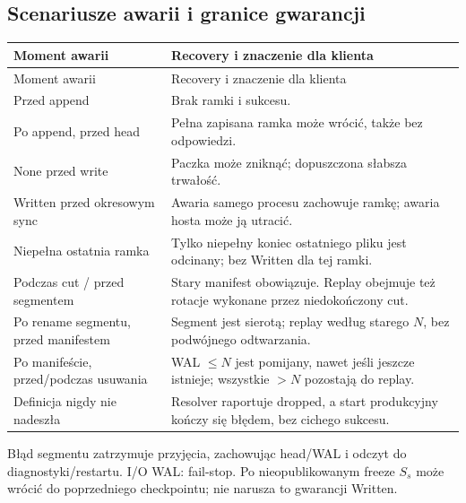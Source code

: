 \documentclass[11pt,a4paper]{article}
\newcommand{\tabhead}[1]{\toprule #1\\ \midrule\endfirsthead
  \toprule #1\\ \midrule\endhead \bottomrule\endfoot}
\begin{document}
\subsection{Scenariusze awarii i granice gwarancji}
\begin{longtable}{P{44mm}P{112mm}}
\tabhead{Moment awarii & Recovery i znaczenie dla klienta}
Przed append & Brak ramki i sukcesu.\\
Po append, przed head & Pełna zapisana ramka może wrócić, także bez odpowiedzi.\\
None przed write & Paczka może zniknąć; dopuszczona słabsza trwałość.\\
Written przed okresowym sync & Awaria samego procesu zachowuje ramkę;
awaria hosta może ją utracić.\\
Niepełna ostatnia ramka & Tylko niepełny koniec ostatniego pliku
jest odcinany; bez Written dla tej ramki.\\
Podczas cut / przed segmentem & Stary manifest obowiązuje.
Replay obejmuje też rotacje wykonane przez niedokończony cut.\\
Po rename segmentu, przed manifestem & Segment jest sierotą;
replay według starego $N$, bez podwójnego odtwarzania.\\
Po manifeście, przed/podczas usuwania & WAL $\leq N$ jest pomijany,
nawet jeśli jeszcze istnieje; wszystkie $>N$ pozostają do replay.\\
Definicja nigdy nie nadeszła & Resolver raportuje dropped,
a start produkcyjny kończy się błędem, bez cichego sukcesu.\\
\end{longtable}
Błąd segmentu zatrzymuje przyjęcia, zachowując head/WAL i odczyt
do diagnostyki/restartu. I/O WAL: fail-stop.
Po nieopublikowanym freeze $S_s$ może wrócić do poprzedniego checkpointu;
nie narusza to gwarancji Written.
\end{document}
